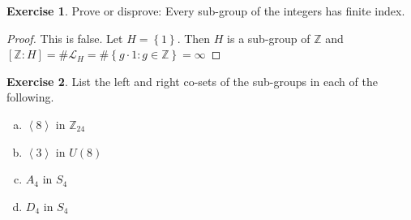 \documentclass{article}
\theoremstyle{definition}
\newtheorem{theorem}{Exercise}[section]
\theoremstyle{remark}
\newcommand{\Z}{\mathbb{Z}}
\begin{document}
	
	\setcounter{theorem}{2}
	\begin{theorem}
		Prove or disprove: Every sub-group of the integers has finite index.
	\end{theorem}
	\begin{proof}
		This is false. Let $H=\left\{1\right\}$. Then $H$ is a sub-group of $\Z$ and $\left[\Z:H\right]=\#\mathcal{L}_H=\#\left\{g\cdot 1:g\in\Z\right\}=\infty$
	\end{proof}


	\setcounter{theorem}{4}
	\begin{theorem} List the left and right co-sets of the sub-groups in each of the following.
		\begin{multicols}{4}
		\begin{enumerate}[(a)]
			\item $\left\langle8\right\rangle$ in $\Z_{24}$
			\item $\left\langle3\right\rangle$ in $U\left(8\right)$
			\setcounter{enumi}{3}
			\item $A_4$ in $S_4$ \addtocounter{enumi}{1}
			\item $D_4$ in $S_4$
		\end{enumerate}
		\end{multicols}
	\end{theorem}
\end{document}
